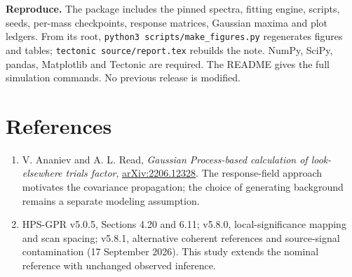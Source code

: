 \documentclass[11pt]{article}
\newcommand{\heading}[1]{\section*{\color{navy}#1}}
\begin{document}
\textbf{Reproduce.} The package includes the pinned spectra, fitting engine, scripts, seeds, per-mass checkpoints, response matrices, Gaussian maxima and plot ledgers. From its root, \texttt{python3 scripts/make\_figures.py} regenerates figures and tables; \texttt{tectonic source/report.tex} rebuilds the note. NumPy, SciPy, pandas, Matplotlib and Tectonic are required. The README gives the full simulation commands. No previous release is modified.

\heading{References}
\begin{enumerate}
\item V. Ananiev and A. L. Read, \textit{Gaussian Process-based calculation of look-elsewhere trials factor}, \href{https://arxiv.org/pdf/2206.12328}{arXiv:2206.12328}. The response-field approach motivates the covariance propagation; the choice of generating background remains a separate modeling assumption.
\item HPS-GPR v5.0.5, Sections 4.20 and 6.11; v5.8.0, local-significance mapping and scan spacing; v5.8.1, alternative coherent references and source-signal contamination (17 September 2026). This study extends the nominal reference with unchanged observed inference.
\end{enumerate}
\end{document}
